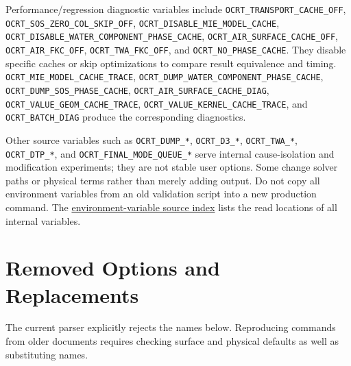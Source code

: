 Performance/regression diagnostic variables include \texttt{OCRT\_\allowbreak{}TRANSPORT\_\allowbreak{}CACHE\_\allowbreak{}OFF}, \texttt{OCRT\_\allowbreak{}SOS\_\allowbreak{}ZERO\_\allowbreak{}COL\_\allowbreak{}SKIP\_\allowbreak{}OFF}, \texttt{OCRT\_\allowbreak{}DISABLE\_\allowbreak{}MIE\_\allowbreak{}MODEL\_\allowbreak{}CACHE}, \texttt{OCRT\_\allowbreak{}DISABLE\_\allowbreak{}WATER\_\allowbreak{}COMPONENT\_\allowbreak{}PHASE\_\allowbreak{}CACHE}, \texttt{OCRT\_\allowbreak{}AIR\_\allowbreak{}SURFACE\_\allowbreak{}CACHE\_\allowbreak{}OFF}, \texttt{OCRT\_\allowbreak{}AIR\_\allowbreak{}FKC\_\allowbreak{}OFF}, \texttt{OCRT\_\allowbreak{}TWA\_\allowbreak{}FKC\_\allowbreak{}OFF}, and \texttt{OCRT\_\allowbreak{}NO\_\allowbreak{}PHASE\_\allowbreak{}CACHE}. They disable specific caches or skip optimizations to compare result equivalence and timing. \texttt{OCRT\_\allowbreak{}MIE\_\allowbreak{}MODEL\_\allowbreak{}CACHE\_\allowbreak{}TRACE}, \texttt{OCRT\_\allowbreak{}DUMP\_\allowbreak{}WATER\_\allowbreak{}COMPONENT\_\allowbreak{}PHASE\_\allowbreak{}CACHE}, \texttt{OCRT\_\allowbreak{}DUMP\_\allowbreak{}SOS\_\allowbreak{}PHASE\_\allowbreak{}CACHE}, \texttt{OCRT\_\allowbreak{}AIR\_\allowbreak{}SURFACE\_\allowbreak{}CACHE\_\allowbreak{}DIAG}, \texttt{OCRT\_\allowbreak{}VALUE\_\allowbreak{}GEOM\_\allowbreak{}CACHE\_\allowbreak{}TRACE}, \texttt{OCRT\_\allowbreak{}VALUE\_\allowbreak{}KERNEL\_\allowbreak{}CACHE\_\allowbreak{}TRACE}, and \texttt{OCRT\_\allowbreak{}BATCH\_\allowbreak{}DIAG} produce the corresponding diagnostics.

Other source variables such as \texttt{OCRT\_\allowbreak{}DUMP\_\allowbreak{}*}, \texttt{OCRT\_\allowbreak{}D3\_\allowbreak{}*}, \texttt{OCRT\_\allowbreak{}TWA\_\allowbreak{}*}, \texttt{OCRT\_\allowbreak{}DTP\_\allowbreak{}*}, and \texttt{OCRT\_\allowbreak{}FINAL\_\allowbreak{}MODE\_\allowbreak{}QUEUE\_\allowbreak{}*} serve internal cause-isolation and modification experiments; they are not stable user options. Some change solver paths or physical terms rather than merely adding output. Do not copy all environment variables from an old validation script into a new production command. The \hyperref[chap:03_environment_index]{environment-variable source index} lists the read locations of all internal variables.

\section{Removed Options and Replacements}
\label{sec:auto:03_options:11}
The current parser explicitly rejects the names below. Reproducing commands from older documents requires checking surface and physical defaults as well as substituting names.


